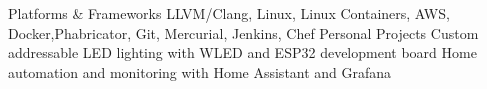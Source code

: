 \begin{cventries}
    \cvskill
    {Platforms \& Frameworks}
    {LLVM/Clang, Linux, Linux Containers, AWS, Docker,\linebreak Phabricator, Git, Mercurial, Jenkins, Chef}
	\cvskill
	{Personal Projects}
	{Custom addressable LED lighting with WLED and ESP32 development board \linebreak Home automation and monitoring with Home Assistant and Grafana}
\end{cventries}

